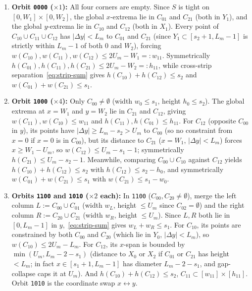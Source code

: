 \documentclass[11pt,reqno]{amsart}
\theoremstyle{plain}
\theoremstyle{definition}
\theoremstyle{remark}
\DeclareRobustCommand{\_}{\ifmmode\text{\textunderscore}\else\textunderscore\allowbreak\fi}
\begin{document}
\begin{enumerate}[label=(\arabic*),leftmargin=2em]
  \item \textbf{Orbit \texttt{0000} ($\times 1$):} All four corners are empty. Since $S$ is tight on $[0, W_1] \times [0, W_2]$, the global $x$-extrema lie in $C_{01}$ and $C_{21}$ (both in $Y_1$), and the global $y$-extrema lie in $C_{10}$ and $C_{12}$ (both in $X_1$). Every point of $C_{10} \cup C_{11} \cup C_{12}$ has $|\Delta y| < L_m$ to $C_{01}$ and $C_{21}$ (since $Y_1 \subset [s_2 + 1, L_m - 1]$ is strictly within $L_m - 1$ of both $0$ and $W_2$), forcing $w(C_{10}), w(C_{11}), w(C_{12}) \le 2 U_m - W_1 =: w_{11}$. Symmetrically $h(C_{01}), h(C_{11}), h(C_{21}) \le 2 U_m - W_2 =: h_{11}$, while cross-strip separation~\eqref{eq:strip-sum} gives $h(C_{10}) + h(C_{12}) \le s_2$ and $w(C_{01}) + w(C_{21}) \le s_1$.
  \item \textbf{Orbit \texttt{1000} ($\times 4$):} Only $C_{00} \neq \emptyset$ (width $w_0 \le s_1$, height $h_0 \le s_2$). The global extrema at $x = W_1$ and $y = W_2$ lie in $C_{21}$ and $C_{12}$, giving $w(C_{11}), w(C_{10}) \le w_{11}$ and $h(C_{11}), h(C_{01}) \le h_{11}$. For $C_{12}$ (opposite $C_{00}$ in $y$), its points have $|\Delta y| \ge L_m - s_2 > U_m$ to $C_{00}$ (so no constraint from $x = 0$ if $x = 0$ is in $C_{00}$), but its distance to $C_{21}$ ($x = W_1$, $|\Delta y| < L_m$) forces $x \ge W_1 - U_m$, so $w(C_{12}) \le U_m - s_1 - 1$; symmetrically $h(C_{21}) \le U_m - s_2 - 1$. Meanwhile, comparing $C_{00} \cup C_{10}$ against $C_{12}$ yields $h(C_{10}) + h(C_{12}) \le s_2$ with $h(C_{12}) \le s_2 - h_0$, and symmetrically $w(C_{01}) + w(C_{21}) \le s_1$ with $w(C_{21}) \le s_1 - w_0$.
  \item \textbf{Orbits \texttt{1100} and \texttt{1010} ($\times 2$ each):} In \texttt{1100} ($C_{00}, C_{20} \neq \emptyset$), merge the left column $L := C_{00} \cup C_{01}$ (width $w_L$, height $\le U_m$ since $C_{02} = \emptyset$) and the right column $R := C_{20} \cup C_{21}$ (width $w_R$, height $\le U_m$). Since $L, R$ both lie in $[0, L_m - 1]$ in $y$,~\eqref{eq:strip-sum} gives $w_L + w_R \le s_1$. For $C_{10}$, its points are constrained by both $C_{00}$ and $C_{20}$ (which lie in $Y_0$, $|\Delta y| < L_m$), so $w(C_{10}) \le 2 U_m - L_m$. For $C_{12}$, its $x$-span is bounded by $\min(U_m, L_m - 2 - s_1)$ (distance to $X_0$ or $X_2$ if $C_{01}$ or $C_{21}$ has height $< L_m$; in fact $x \in [s_1 + 1, L_m - 1]$ has diameter $L_m - 2 - s_1$, and gap-collapse caps it at $U_m$). And $h(C_{10}) + h(C_{12}) \le s_2$, $C_{11} \subset [w_{11}] \times [h_{11}]$. Orbit \texttt{1010} is the coordinate swap $x \leftrightarrow y$.

\end{enumerate}
\end{document}
